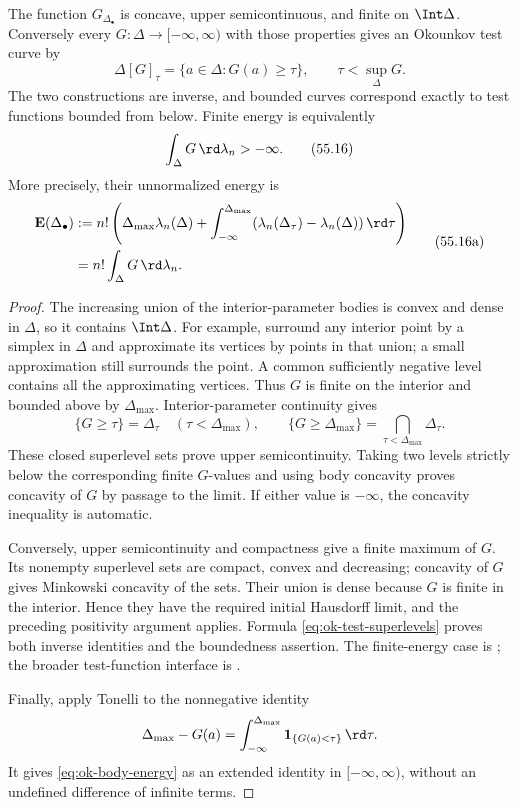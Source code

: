 \begin{proposition}
\label{prop:ok-test-function-duality}
The function $G_{\Delta_\bullet}$ is concave, upper semicontinuous, and
finite on $\Int\Delta$.
Conversely every $G:\Delta\to[-\infty,\infty)$ with those properties
gives an Okounkov test curve by
\[
 \Delta[G]_\tau=\{a\in\Delta:G(a)\geq\tau\},
 \qquad \tau<\sup_\Delta G.
\tag{55.15}\label{eq:ok-inverse-legendre}
\]
The two constructions are inverse, and bounded curves correspond exactly
to test functions bounded from below.
Finite energy is equivalently
\[
                         \int_\Delta G\,\rd\lambda_n>-\infty.
\tag{55.16}\label{eq:ok-finite-energy}
\]
More precisely, their unnormalized energy is
\[
 \begin{split}
 \mathbf E(\Delta_\bullet)
 &:=n!\left(\Delta_{\max}\lambda_n(\Delta)
       +\int_{-\infty}^{\Delta_{\max}}
          (\lambda_n(\Delta_\tau)-\lambda_n(\Delta))\,\rd\tau\right)\\
 &=n!\int_\Delta G\,\rd\lambda_n.
 \end{split}
\tag{55.16a}\label{eq:ok-body-energy}
\]
\end{proposition}

\begin{proof}
The increasing union of the interior-parameter bodies is convex and dense
in $\Delta$, so it contains $\Int\Delta$.  For example, surround any
interior point by a simplex in $\Delta$ and approximate its vertices by
points in that union; a small approximation still surrounds the point.
A common sufficiently negative level contains all the approximating vertices.
Thus $G$ is finite on the interior and bounded above by $\Delta_{\max}$.
Interior-parameter continuity gives
\[
 \{G\geq\tau\}=\Delta_\tau\quad(\tau<\Delta_{\max}),\qquad
 \{G\geq\Delta_{\max}\}=\bigcap_{\tau<\Delta_{\max}}\Delta_\tau.
\tag{55.16b}\label{eq:ok-test-superlevels}
\]
These closed superlevel sets prove upper semicontinuity.  Taking two levels
strictly below the corresponding finite $G$-values and using body concavity
proves concavity of $G$ by passage to the limit.  If either value is
$-\infty$, the concavity inequality is automatic.

Conversely, upper semicontinuity and compactness give a finite maximum of
$G$.  Its nonempty superlevel sets are compact, convex and decreasing;
concavity of $G$ gives Minkowski concavity of the sets.  Their union is dense
because $G$ is finite in the interior.  Hence they have the required initial
Hausdorff limit, and the preceding positivity argument applies.  Formula
\eqref{eq:ok-test-superlevels} proves both inverse identities and the
boundedness assertion.  The finite-energy case is \cite[Theorem~7.5]{Xia21};
the broader test-function interface is \cite[Theorem~10.5.1]{XiaBook}.

Finally, apply Tonelli to the nonnegative identity
\[
 \Delta_{\max}-G(a)
 =\int_{-\infty}^{\Delta_{\max}}
       \mathbf1_{\{G(a)<\tau\}}\,\rd\tau.
\]
It gives \eqref{eq:ok-body-energy} as an extended identity in
$[-\infty,\infty)$, without an undefined difference of infinite terms.
\end{proof}

